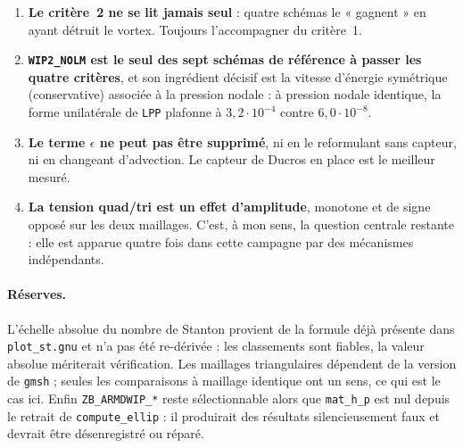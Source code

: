 \documentclass[11pt,a4paper]{article}
\begin{document}
\begin{enumerate}\itemsep3pt
  \item \textbf{Le critère~2 ne se lit jamais seul} : quatre schémas le « gagnent » en
        ayant détruit le vortex. Toujours l'accompagner du critère~1.
  \item \textbf{\texttt{WIP2\_NOLM} est le seul des sept schémas de référence à passer
        les quatre critères}, et son ingrédient décisif est la vitesse d'énergie
        symétrique (conservative) associée à la pression nodale : à pression nodale
        identique, la forme unilatérale de \texttt{LPP} plafonne à
        $3{,}2\cdot10^{-4}$ contre $6{,}0\cdot10^{-8}$.
  \item \textbf{Le terme $\epsilon$ ne peut pas être supprimé}, ni en le reformulant
        sans capteur, ni en changeant d'advection. Le capteur de Ducros en place est
        le meilleur mesuré.
  \item \textbf{La tension quad/tri est un effet d'amplitude}, monotone et de signe
        opposé sur les deux maillages. C'est, à mon sens, la question centrale
        restante : elle est apparue quatre fois dans cette campagne par des mécanismes
        indépendants.
\end{enumerate}

\paragraph{Réserves.} L'échelle absolue du nombre de Stanton provient de la formule déjà
présente dans \texttt{plot\_st.gnu} et n'a pas été re-dérivée : les classements sont
fiables, la valeur absolue mériterait vérification. Les maillages triangulaires
dépendent de la version de \texttt{gmsh} ; seules les comparaisons à maillage identique
ont un sens, ce qui est le cas ici. Enfin \texttt{ZB\_ARMDWIP\_*} reste sélectionnable
alors que \texttt{mat\_h\_p} est nul depuis le retrait de \texttt{compute\_ellip} : il
produirait des résultats silencieusement faux et devrait être désenregistré ou réparé.
\end{document}

